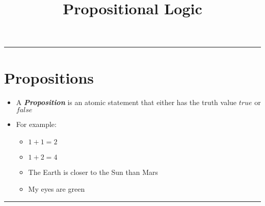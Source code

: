 \documentclass{article}
\title{{Propositional Logic}}
\begin{document}
\maketitle

\begin{center}
  \rule{0.5\textwidth}{0.4pt}
\end{center}

\section{Propositions}
\begin{itemize}
  \item{A \textbf{\textit{Proposition}} is an atomic statement that either has the truth value $true$ or $false$}
  \item{For example:}
  \begin{itemize}
    \item{$1 + 1 = 2$}
    \item{$1 + 2 = 4$}
    \item{The Earth is closer to the Sun than Mars}
    \item{My eyes are green}
  \end{itemize}
\end{itemize}

\begin{center}
  \rule{0.5\textwidth}{0.4pt}
\end{center}
\end{document}
